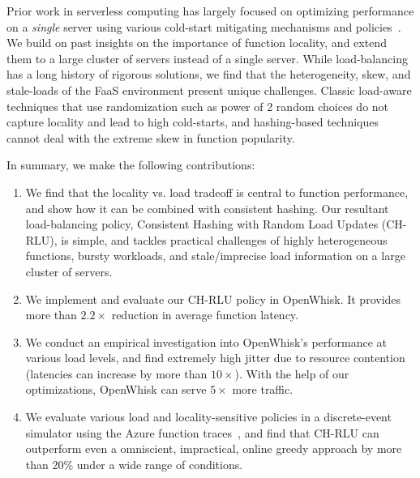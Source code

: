 Prior work in serverless computing has largely focused on optimizing performance on a \emph{single} server using various cold-start mitigating mechanisms and policies~\cite{vhive-asplos21,faascache-asplos21}. 
We build on past insights on the importance of function locality, and extend them to a large cluster of servers instead of a single server. 
While load-balancing has a long history of rigorous solutions, we find that the heterogeneity, skew, and stale-loads of the FaaS environment present unique challenges. 
Classic load-aware techniques that use randomization such as power of 2 random choices do not capture locality and lead to high cold-starts, and hashing-based techniques cannot deal with the extreme skew in function popularity.



In summary, we make the following contributions:

\begin{enumerate}
\item We find that the locality vs. load tradeoff is central to function performance, and show how it can be combined with consistent hashing. Our resultant load-balancing policy, Consistent Hashing with Random Load Updates (CH-RLU), is simple, and tackles practical challenges of highly heterogeneous functions, bursty workloads, and stale/imprecise load information on a large cluster of servers.
\item We implement and evaluate our CH-RLU policy in OpenWhisk. It provides more than $2.2\times$ reduction in average function latency.
\item We conduct an empirical investigation into OpenWhisk's performance at various load levels, and find extremely high jitter due to resource contention (latencies can increase by more than $10\times$).
  With the help of our optimizations, OpenWhisk can serve $5\times$ more traffic. 
\item We evaluate various load and locality-sensitive policies in a discrete-event simulator using the Azure function traces~\cite{shahrad_serverless_2020}, and find that CH-RLU can outperform even a omniscient, impractical, online greedy approach by more than 20\% under a wide range of conditions. 
\end{enumerate}

